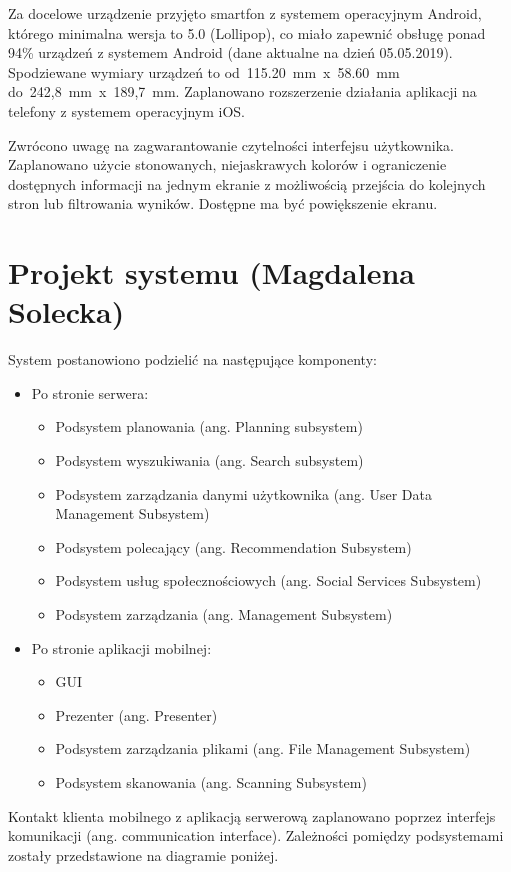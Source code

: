 \documentclass[10pt,twoside,a4paper]{report}
\begin{document}
\par Za docelowe urządzenie przyjęto smartfon z systemem operacyjnym Android, którego minimalna wersja to 5.0 (Lollipop), co miało zapewnić obsługę ponad 94\% urządzeń z systemem Android (dane aktualne na dzień 05.05.2019\cite{Android usage}). Spodziewane wymiary urządzeń to od~115.20~mm~x~58.60~mm do~242,8~mm~x~189,7~mm. Zaplanowano rozszerzenie działania aplikacji na telefony z systemem operacyjnym iOS.

\par Zwrócono uwagę na zagwarantowanie czytelności interfejsu użytkownika. Zaplanowano użycie stonowanych, niejaskrawych kolorów i ograniczenie dostępnych informacji na jednym ekranie z możliwością przejścia do kolejnych stron lub filtrowania wyników. Dostępne ma być powiększenie ekranu.

\chapter{Projekt systemu (Magdalena Solecka)}
\par System postanowiono podzielić na następujące komponenty:
\begin{itemize}
\item Po stronie serwera:
\begin{itemize}
\item Podsystem planowania (ang. Planning subsystem)
\item Podsystem wyszukiwania (ang. Search subsystem)
\item Podsystem zarządzania danymi użytkownika (ang. User Data Management Subsystem)
\item Podsystem polecający (ang. Recommendation Subsystem)
\item Podsystem usług społecznościowych (ang. Social Services Subsystem)
\item Podsystem zarządzania (ang. Management Subsystem)
\end{itemize}
\item Po stronie aplikacji mobilnej:
\begin{itemize}
\item GUI
\item Prezenter (ang. Presenter)
\item Podsystem zarządzania plikami (ang. File Management Subsystem)
\item Podsystem skanowania (ang. Scanning Subsystem)
\end{itemize}
\end{itemize}
\par Kontakt klienta mobilnego z aplikacją serwerową zaplanowano poprzez interfejs komunikacji (ang. communication interface). Zależności pomiędzy podsystemami zostały przedstawione na diagramie poniżej.
\end{document}
